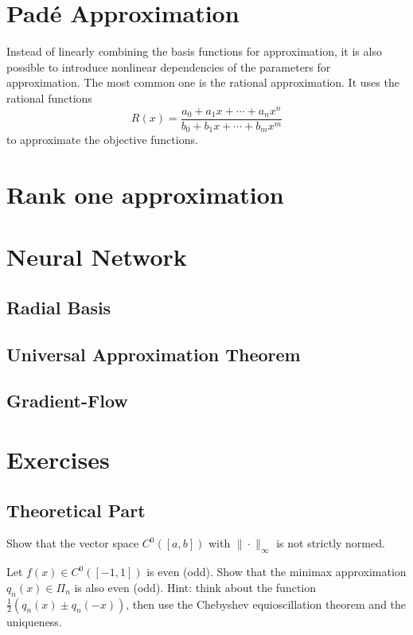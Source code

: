 \section{Pad\'e Approximation}
Instead of linearly combining the basis functions for approximation, it is also possible to introduce nonlinear dependencies of the parameters for approximation. The most common one is the rational approximation. It uses the rational functions 
\begin{equation}
    R(x) = \frac{a_0 + a_1 x + \cdots + a_n x^n}{b_0 + b_1 x + \cdots + b_m x^m}
\end{equation}
to approximate the objective functions.
\section{Rank one approximation}
\section{Neural Network}
\subsection{Radial Basis}
\subsection{Universal Approximation Theorem}
\subsection{Gradient-Flow}
\section{Exercises}
\subsection{Theoretical Part}
\begin{problem}
    Show that the vector space $C^0([a, b])$ with $\|\cdot\|_{\infty}$ is not strictly normed.
\end{problem}
\begin{problem}
    Let $f(x)\in C^0([-1,1])$ is even (odd). Show that the minimax approximation $q_n(x)\in\Pi_n$ is also even (odd).
    Hint: think about the function $\frac{1}{2}(q_n(x) \pm q_n(-x))$, then use the Chebyshev equioscillation theorem and the uniqueness.
\end{problem}

